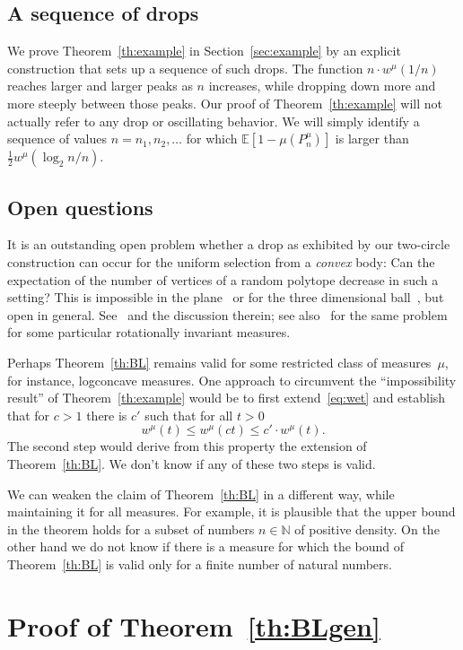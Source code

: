 \documentclass[AHL,Unicode,longabstracts]{cedram}
\newcommand{\Nbb}{\mathbb{N}}%
\newcommand{\Ebb}{\mathbb{E}}%
\begin{document}
\subsection{A sequence of drops}

We prove Theorem~\ref{th:example} in Section~\ref{sec:example} by an explicit construction that sets up a sequence of such drops. The function $n\cdot w^\mu(1/n)$ reaches larger and larger peaks as $n$ increases, while dropping down more and more steeply between those peaks. Our proof of Theorem~\ref{th:example} will not actually refer to any drop or oscillating behavior. We will simply identify a sequence of values $n=n_1, n_2, \ldots$ for which $\Ebb[1-\mu(P_{n}^\mu)]$ is larger than $\frac12 w^\mu(\log_2 n/n)$.


\subsection{Open questions}

It is an outstanding open problem whether a drop as exhibited by our two-circle construction can occur for the uniform selection from a \emph{convex} body: Can the expectation of the number of vertices of a random polytope decrease in such a setting? This is impossible in the plane~\cite{DGG} or for the three dimensional ball~\cite{Beermann}, but open in general. See~\cite{BR} and the discussion therein; see also~\cite{KTZ} for the same problem for some particular rotationally invariant measures.

Perhaps Theorem~\ref{th:BL} remains valid for some restricted class of measures~$\mu$, for instance, logconcave measures. One approach to circumvent the ``impossibility result'' of Theorem~\ref{th:example} would be to first extend~\eqref{eq:wet} and establish that for $c>1$ there is $c'$ such that for all $t>0$
\[
w^{\mu}(t) \le w^{\mu}(ct) \le c' \cdot w^{\mu}(t).
\]
The second step would derive from this property the extension of Theorem~\ref{th:BL}. We don't know if any of these two steps is valid.

We can weaken the claim of Theorem~\ref{th:BL} in a different way, while maintaining it for all measures. For example, it is plausible that the upper bound in the theorem holds for a subset of numbers $n \in \Nbb$ of positive density. On the other hand we do not know if there is a measure for which the bound of Theorem~\ref{th:BL} is valid only for a finite number of natural numbers.


\section{Proof of Theorem~\ref{th:BLgen}}\label{sec:proofBLgen}
\end{document}

